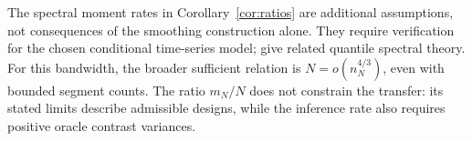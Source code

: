 The spectral moment rates in Corollary~\ref{cor:ratios} are additional assumptions, not consequences of the smoothing construction alone. They require verification for the chosen conditional time-series model; \citet{Kley2016,Birr2017} give related quantile spectral theory. For this bandwidth, the broader sufficient relation is $N=o(n_N^{4/3})$, even with bounded segment counts. The ratio $m_N/N$ does not constrain the transfer: its stated limits describe admissible designs, while the inference rate also requires positive oracle contrast variances.
